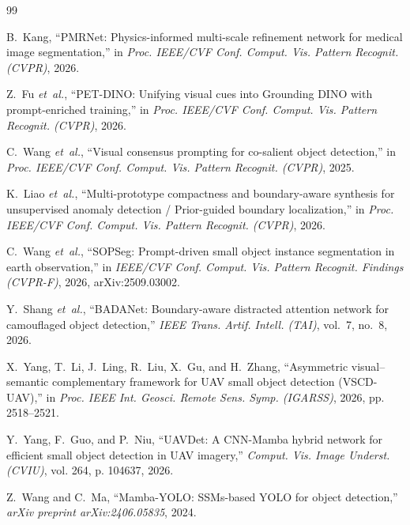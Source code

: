 \documentclass[11pt,a4paper]{article}
\begin{document}
\newpage
\begingroup
\small
\setlength{\itemsep}{1.5pt}
\begin{thebibliography}{99}

B.~Kang, ``PMRNet: Physics-informed multi-scale refinement network for medical image segmentation,'' in \emph{Proc. IEEE/CVF Conf. Comput. Vis. Pattern Recognit. (CVPR)}, 2026.

Z.~Fu \emph{et~al.}, ``PET-DINO: Unifying visual cues into Grounding DINO with prompt-enriched training,'' in \emph{Proc. IEEE/CVF Conf. Comput. Vis. Pattern Recognit. (CVPR)}, 2026.

C.~Wang \emph{et~al.}, ``Visual consensus prompting for co-salient object detection,'' in \emph{Proc. IEEE/CVF Conf. Comput. Vis. Pattern Recognit. (CVPR)}, 2025.

K.~Liao \emph{et~al.}, ``Multi-prototype compactness and boundary-aware synthesis for unsupervised anomaly detection / Prior-guided boundary localization,'' in \emph{Proc. IEEE/CVF Conf. Comput. Vis. Pattern Recognit. (CVPR)}, 2026.

C.~Wang \emph{et~al.}, ``SOPSeg: Prompt-driven small object instance segmentation in earth observation,'' in \emph{IEEE/CVF Conf. Comput. Vis. Pattern Recognit. Findings (CVPR-F)}, 2026, arXiv:2509.03002.

Y.~Shang \emph{et~al.}, ``BADANet: Boundary-aware distracted attention network for camouflaged object detection,'' \emph{IEEE Trans. Artif. Intell. (TAI)}, vol.~7, no.~8, 2026.

X.~Yang, T.~Li, J.~Ling, R.~Liu, X.~Gu, and H.~Zhang, ``Asymmetric visual--semantic complementary framework for UAV small object detection (VSCD-UAV),'' in \emph{Proc. IEEE Int. Geosci. Remote Sens. Symp. (IGARSS)}, 2026, pp. 2518--2521.

Y.~Yang, F.~Guo, and P.~Niu, ``UAVDet: A CNN-Mamba hybrid network for efficient small object detection in UAV imagery,'' \emph{Comput. Vis. Image Underst. (CVIU)}, vol. 264, p. 104637, 2026.

Z.~Wang and C.~Ma, ``Mamba-YOLO: SSMs-based YOLO for object detection,'' \emph{arXiv preprint arXiv:2406.05835}, 2024.


\end{thebibliography}
\end{document}

